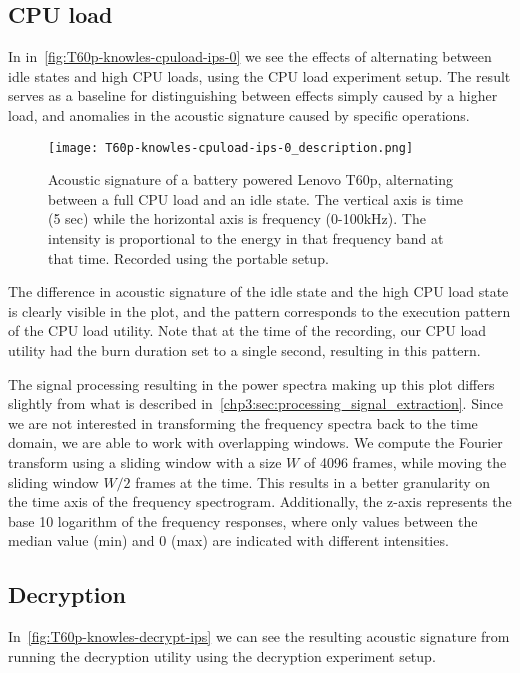 \subsection{CPU load}\label{chp5:subsec:t60p_knowles_results_cpuload}
In in~\autoref{fig:T60p-knowles-cpuload-ips-0} we see the effects of alternating between idle states and high \gls{CPU} loads, using the \gls{CPU} load experiment setup.
The result serves as a baseline for distinguishing between effects simply caused by a higher load, and anomalies in the acoustic signature caused by specific operations.

\begin{figure}[ht]
    \centering
    \texttt{[image: T60p-knowles-cpuload-ips-0\_description.png]}
    \caption{Acoustic signature of a battery powered Lenovo T60p, alternating between a full \gls{CPU} load and an idle state.
        The vertical axis is time (5 sec) while the horizontal axis is frequency (0-100kHz).
        The intensity is proportional to the energy in that frequency band at that time.
        Recorded using the portable setup.}
    \label{fig:T60p-knowles-cpuload-ips-0}
\end{figure}

The difference in acoustic signature of the idle state and the high \gls{CPU} load state is clearly visible in the plot, and the pattern corresponds to the execution pattern of the CPU load utility. 
Note that at the time of the recording, our \gls{CPU} load utility had the burn duration set to a single second, resulting in this pattern.

The signal processing resulting in the power spectra making up this plot differs slightly from what is described in~\autoref{chp3:sec:processing_signal_extraction}.
Since we are not interested in transforming the frequency spectra back to the time domain, we are able to work with overlapping windows.
We compute the Fourier transform using a sliding window with a size $W$ of 4096 frames, while moving the sliding window \({W/2}\) frames at the time.
This results in a better granularity on the time axis of the frequency spectrogram.
Additionally, the z-axis represents the base 10 logarithm of the frequency responses, where only values between the median value (min) and 0 (max) are indicated with different intensities.


\subsection{Decryption}\label{chp5:subsec:t60p_knowles_results_decryption}
In~\autoref{fig:T60p-knowles-decrypt-ips} we can see the resulting acoustic signature from running the decryption utility using the decryption experiment setup.

